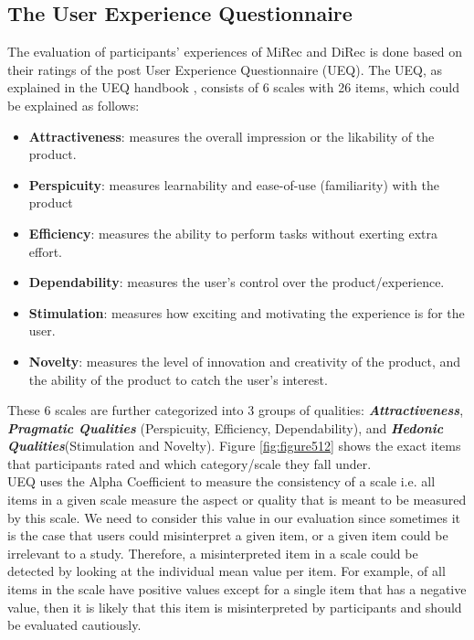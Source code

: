 \subsection{The User Experience Questionnaire}
The evaluation of participants' experiences of MiRec and DiRec is done based
on their ratings of the post User Experience Questionnaire (UEQ). The UEQ, as
explained in the UEQ handbook \cite{UEQHandbook}, consists of 6 scales with 26
items, which could be explained as follows:
\begin{itemize}
  \item \textbf{Attractiveness}: measures the overall impression or the
  likability of the product.
  \item \textbf{Perspicuity}: measures learnability and ease-of-use
  (familiarity) with the product
  \item \textbf{Efficiency}: measures the ability to perform tasks without
  exerting extra effort.
  \item \textbf{Dependability}: measures the user's control over the
  product/experience.
  \item \textbf{Stimulation}: measures how exciting and motivating the
  experience is for the user.
  \item \textbf{Novelty}: measures the level of innovation and creativity of the
  product, and the ability of the product to catch the user's interest.
\end{itemize}
These 6 scales are further categorized into 3 groups of qualities:
\textbf{\textit{Attractiveness}}, \textbf{\textit{Pragmatic
Qualities}} (Perspicuity, Efficiency, Dependability), and
\textbf{\textit{Hedonic Qualities}}(Stimulation and Novelty). Figure
\ref{fig:figure512} shows the exact items that participants rated and which
category/scale they fall under.\\

UEQ uses the Alpha Coefficient to measure the consistency of a scale i.e.
all items in a given scale  measure the aspect or quality that is meant to be
measured by this scale.
We need to consider this value in our evaluation since sometimes it is the case
that users could misinterpret a given item, or a given item could be irrelevant
to a study. Therefore, a misinterpreted item in a scale could be detected by
looking at the individual mean value per item. For example, of all items in the
scale have positive values except for a single item that has a negative value,
then it is likely that this item is misinterpreted by participants and should be
evaluated cautiously.\\

